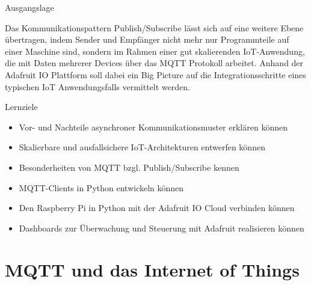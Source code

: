 \begin{frame}{Ausgangslage}
    
    Das Kommunikationspattern Publish/Subscribe lässt sich auf eine weitere Ebene übertragen, indem Sender und Empfänger nicht mehr nur Programmteile auf einer Maschine sind, sondern  im Rahmen einer gut skalierenden IoT-Anwendung, die mit Daten mehrerer Devices über das MQTT Protokoll arbeitet. Anhand der Adafruit IO Plattform soll dabei ein Big Picture auf die Integrationsschritte eines typischen IoT Anwendungsfalls vermittelt werden.

\end{frame}

\begin{frame}{Lernziele}
    \begin{itemize}
        \item Vor- und Nachteile asynchroner Kommunikationsmuster erklären können
        \item Skalierbare und ausfallsichere IoT-Architekturen entwerfen können
        \item Besonderheiten von MQTT bzgl. Publish/Subscribe kennen
        \item MQTT-Clients in Python entwickeln können
        \item Den Raspberry Pi in Python mit der Adafruit IO Cloud verbinden können
        \item Dashboards zur Überwachung und Steuerung mit Adafruit realisieren können
    \end{itemize}
\end{frame}





\section{MQTT und das Internet of Things}

